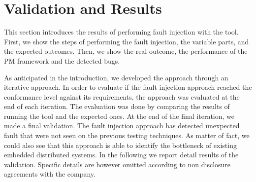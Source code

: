 \section{Validation and Results}\label{sec:results}
This section introduces the results of performing fault injection with the \approach{} %
tool. First, we show the steps of performing the fault injection, the variable parts, and the expected outcomes. Then, we show the real outcome, the performance of the PM framework and the detected bugs.



As anticipated in the introduction, we developed the approach through an iterative approach. In order to evaluate if the fault injection approach reached the conformance level against its requirements, the approach was evaluated at the end of each iteration. 
The evaluation was done by comparing the results of running the tool and the expected ones. At the end of the final iteration, we made a final validation. 
The fault injection approach has detected unexpected fault that were not seen on the previous testing techniques. As matter of fact, we could also see that this approach is able to identify the bottleneck of existing embedded distributed systems.  In the following we report detail results of the validation. Specific details are however omitted according to non disclosure agreements with the company.


